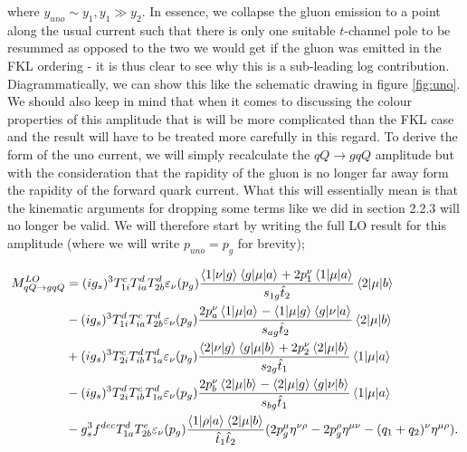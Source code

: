 where $y_{uno} \sim y_1, y_1 \gg y_2$. In essence, we collapse the gluon emission to a point along the usual current such that there is only one suitable $t$-channel pole to be resummed as opposed to the two we would get if the gluon was emitted in the FKL ordering - it is thus clear to see why this is a sub-leading log contribution. Diagrammatically, we can show this like the schematic drawing in figure \ref{fig:uno}. We should also keep in mind that when it comes to discussing the colour properties of this amplitude that is will be more complicated than the FKL case and the result will have to be treated more carefully in this regard. To derive the form of the uno current, we will simply recalculate the $qQ \to gqQ$ amplitude but with the consideration that the rapidity of the gluon is no longer far away form the rapidity of the forward quark current. What this will essentially mean is that the kinematic arguments for dropping some terms like we did in section 2.2.3 will no longer be valid. We will therefore start by writing the full LO result for this amplitude (where we will write $p_{uno} = p_g$ for brevity);

\begin{equation}
\begin{split}
M_{qQ \to gqQ}^{LO} &= (ig_s)^3 T^c_{1i}T_{ia}^d T^d_{2b} \varepsilon_{\nu}(p_g) \frac{\mathinner{\langle1\vert\nu\vert g\rangle}_{}\mathinner{\langle g\vert\mu\vert a\rangle}_{} + 2p_1^\nu \mathinner{\langle1\vert\mu\vert a\rangle}_{}}{s_{1g}\hat{t}_2}\mathinner{\langle2\vert\mu\vert b\rangle}_{} \\
 &- (ig_s)^3 T^d_{1i}T_{ia}^c T^d_{2b} \varepsilon_{\nu}(p_g) \frac{2p_a^\nu \mathinner{\langle1\vert\mu\vert a\rangle}_{} - \mathinner{\langle1\vert\mu\vert g\rangle}_{}\mathinner{\langle g\vert\nu\vert a\rangle}_{}}{s_{ag}\hat{t}_2}\mathinner{\langle2\vert\mu\vert b\rangle}_{} \\
 &+ (ig_s)^3 T^c_{2i}T_{ib}^d T^d_{1a} \varepsilon_{\nu}(p_g) \frac{\mathinner{\langle2\vert\nu\vert g\rangle}_{}\mathinner{\langle g\vert\mu\vert b\rangle}_{} + 2p_2^\nu \mathinner{\langle2\vert\mu\vert b\rangle}_{}}{s_{2g}\hat{t}_1}\mathinner{\langle1\vert\mu\vert a\rangle}_{} \\
  &- (ig_s)^3 T^d_{2i}T_{ib}^c T^d_{1a} \varepsilon_{\nu}(p_g) \frac{2p_b^\nu \mathinner{\langle2\vert\mu\vert b\rangle}_{} - \mathinner{\langle2\vert\mu\vert g\rangle}_{}\mathinner{\langle g\vert\nu\vert b\rangle}_{}}{s_{bg}\hat{t}_1}\mathinner{\langle1\vert\mu\vert a\rangle}_{} \\
  &-g_s^3 f^{dec}T^d_{1a}T^e_{2b} \varepsilon_\nu(p_g) \frac{\mathinner{\langle1\vert\rho\vert a\rangle}_{}\mathinner{\langle2\vert\mu\vert b\rangle}_{}}{\hat{t}_1 \hat{t}_2}(2p_g^\mu \eta^{\nu \rho} - 2p_g^\rho \eta^{\mu \nu} - (q_1 + q_2)^\nu \eta^{\mu \rho}).
\end{split}
\end{equation}

